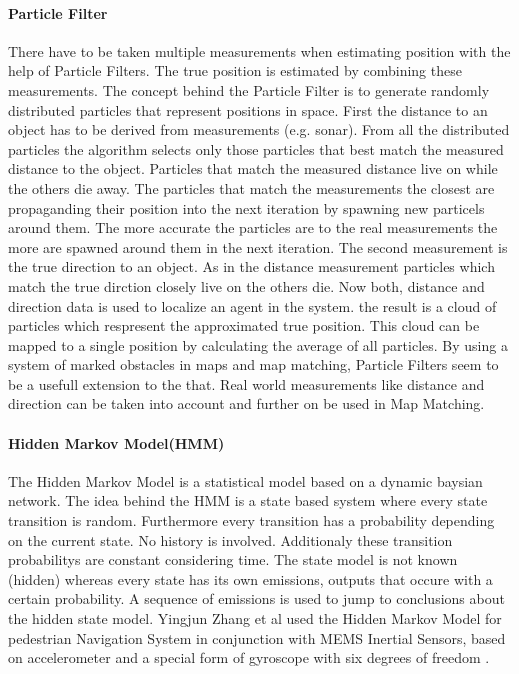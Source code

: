 \paragraph{Particle Filter} 
There have to be taken multiple measurements when estimating position with the help of Particle Filters. The true position is estimated by combining these measurements. The concept behind the Particle Filter is to generate randomly distributed particles that represent positions in space.  First the distance to an object has to be derived from measurements (e.g. sonar). From all the distributed particles the algorithm selects only those particles that best match the measured distance to the object. Particles that match the measured distance live on while the others die away. The particles that match the measurements the closest are propaganding their position into the next iteration by spawning new particels around them. The more accurate the particles are to the real measurements the more are spawned around them in the next iteration. The second measurement is the true direction to an object. As in the distance measurement particles which match the true dirction closely live on the others die. Now both, distance and direction data is used to localize an agent in the system. the result is a cloud of particles which respresent the approximated true position. This cloud can be mapped to a single position by calculating the average of all particles. By using a system of marked obstacles in maps and map matching, Particle Filters seem to be a usefull extension to the that. Real world measurements like distance and direction can be taken into account and further on be used in Map Matching. 

\paragraph{Hidden Markov Model(HMM)}
The Hidden Markov Model is a statistical model based on a dynamic baysian network. The idea behind the HMM is a state based system where every state transition is random. Furthermore every transition has a probability depending on the current state. No history is involved. Additionaly these transition probabilitys are constant considering time. The state model is not known (hidden) whereas every state has its own emissions, outputs that occure with a certain probability. A sequence of emissions is used to jump to conclusions about the hidden state model. Yingjun Zhang et al used the Hidden Markov Model for pedestrian Navigation System in conjunction with MEMS Inertial Sensors, based on accelerometer and a special form of gyroscope with six degrees of freedom \parencite{HiddenMarkovModel}.


